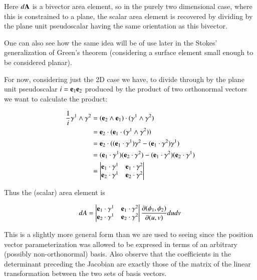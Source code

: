 \documentclass{article}
\newcommand{\PD}[2]{\frac{\partial {#2}}{\partial {#1}}}
\begin{document}
Here $d\mathbf{A}$ is a bivector area element, so in the purely two dimensional case, where this is constrained to a plane, the scalar area element
is recovered by dividing by the plane unit pseudoscalar having the same orientation as this bivector.

One can also see how the same idea will be of use later in the Stokes' generalization of Green's theorem (considering a surface element small enough to be considered planar).

For now, considering just the 2D case we have, to divide through by the plane unit pseudoscalar $i = \mathbf{e}_1\mathbf{e}_2$ produced by the product of two orthonormal vectors we want to calculate the product:

\begin{align*}
\frac{1}{i} \gamma^{1} \wedge \gamma^{2} 
&= (\mathbf{e}_2 \wedge \mathbf{e}_1) \cdot (\gamma^{1} \wedge \gamma^{2}) \\
&= \mathbf{e}_2 \cdot (\mathbf{e}_1 \cdot (\gamma^{1} \wedge \gamma^{2})) \\
&= \mathbf{e}_2 \cdot ( (\mathbf{e}_1 \cdot \gamma^{1}) \gamma^{2} -(\mathbf{e}_1 \cdot \gamma^{2}) \gamma^{1} ) \\
&= (\mathbf{e}_1 \cdot \gamma^{1}) (\mathbf{e}_2 \cdot \gamma^{2}) -(\mathbf{e}_1 \cdot \gamma^{2}) (\mathbf{e}_2 \cdot \gamma^{1}) \\
&=
\begin{vmatrix}
\mathbf{e}_1 \cdot \gamma^{1} & \mathbf{e}_1 \cdot \gamma^{2} \\
\mathbf{e}_2 \cdot \gamma^{1} & \mathbf{e}_2 \cdot \gamma^{2}
\end{vmatrix}
\end{align*}

Thus the (scalar) area element is

\begin{align}\label{eqn:jacobianframe}
dA =
\begin{vmatrix}
\Be_1 \cdot \gamma^{1} & \Be_1 \cdot \gamma^{2} \\
\Be_2 \cdot \gamma^{1} & \Be_2 \cdot \gamma^{2}
\end{vmatrix}
\PD{(u,v)}{(\phi_1,\phi_2)} du dv
\end{align}

This is a slightly more general form than we are used to seeing since the position vector parameterization was allowed to be expresed in terms
of an arbitrary (possibly non-orthonormal) basis.  Also observe that the coefficients in the determinant preceding the Jacobian are exactly those of the matrix of the linear transformation between the two sets of basis vectors.
\end{document}
